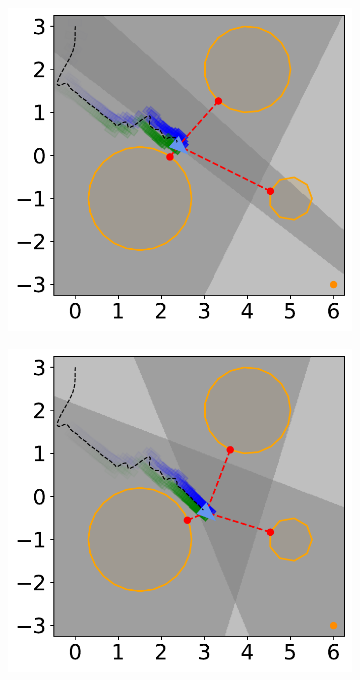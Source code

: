 \begin{figure}[H]
    \begin{subfigure}{0.35\textwidth}
        \centering
        \includegraphics[width=\textwidth]{figures/Simulations/sim1circles_delta/frame_4.pdf}
    \end{subfigure}
    \hspace{1em}
    \begin{subfigure}{0.35\textwidth}
        \centering
        \includegraphics[width=\textwidth]{figures/Simulations/sim1circles_delta/frame_5.pdf}
    \end{subfigure}%
    

\end{figure}
